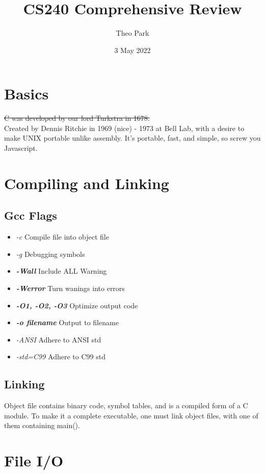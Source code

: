 \documentclass{article}
\title{CS240 Comprehensive Review}
\author{Theo Park}
\date{3 May 2022}
\begin{document}
\maketitle

\section{Basics}
\st{C was developed by our lord Turkstra in 1678.}\\
Created by Dennis Ritchie in 1969 (nice) - 1973 at Bell Lab, with a desire to make UNIX portable unlike assembly.
It's portable, fast, and simple, so screw you Javascript.


\section{Compiling and Linking}

\subsection{Gcc Flags}
\begin{itemize}
    \item \textit{-c} Compile file into object file
    \item \textit{-g} Debugging symbols
    \item \textbf{\textit{-Wall}} Include ALL Warning
    \item \textbf{\textit{-Werror}} Turn wanings into errors
    \item \textbf{\textit{-O1, -O2, -O3}} Optimize output code
    \item \textbf{\textit{-o filename}} Output to filename
    \item \textit{-ANSI} Adhere to ANSI std
    \item \textit{-std=C99} Adhere to C99 std
\end{itemize}

\subsection{Linking}
Object file contains binary code, symbol tables, and is a compiled form of a C module.
To make it a complete executable, one must link object files, with one of them containing main().

\section{File I/O}
\end{document}
